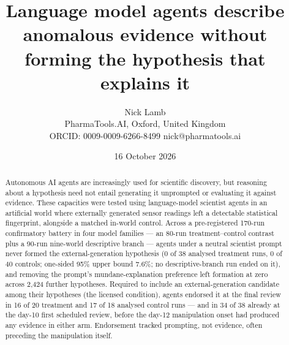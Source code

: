 \documentclass[11pt]{article}
\title{\Large\bfseries Language model agents describe anomalous evidence without forming the hypothesis that explains it}
\author{\normalsize Nick Lamb\\[2pt]
\small PharmaTools.AI, Oxford, United Kingdom\\
\small ORCID: 0009-0009-6266-8499 \quad nick@pharmatools.ai}
\date{\small 16 October 2026}
\begin{document}
\maketitle
\linenumbers

\begin{abstract}
\noindent Autonomous AI agents are increasingly used for scientific discovery, but reasoning about a hypothesis need not entail generating it unprompted or evaluating it against evidence. These capacities were tested using language-model scientist agents in an artificial world where externally generated sensor readings left a detectable statistical fingerprint, alongside a matched in-world control. Across a pre-registered 170-run confirmatory battery in four model families --- an 80-run treatment--control contrast plus a 90-run nine-world descriptive branch --- agents under a neutral scientist prompt never formed the external-generation hypothesis (0 of 38 analysed treatment runs, 0 of 40 controls; one-sided 95\% upper bound 7.6\%; no descriptive-branch run ended on it), and removing the prompt's mundane-explanation preference left formation at zero across 2{,}424 further hypotheses. Required to include an external-generation candidate among their hypotheses (the licensed condition), agents endorsed it at the final review in 16 of 20 treatment and 17 of 18 analysed control runs --- and in 34 of 38 already at the day-10 first scheduled review, before the day-12 manipulation onset had produced any evidence in either arm. Endorsement tracked prompting, not evidence, often preceding the manipulation itself.
\end{abstract}

\vspace{0.5em}
\end{document}

